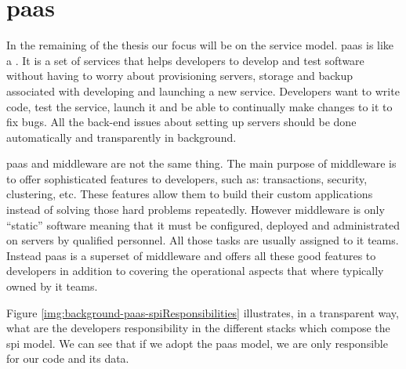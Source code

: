 %
%
\section{\acf{paas}}
\label{sec:background-paas}
In the remaining of the thesis our focus will be on the  service model.
\ac{paas} is like a . It is a set of services that helps developers
to develop and test software without having to worry about provisioning servers, storage and backup
associated with developing and launching a new service. Developers want to write code, test the service,
launch it and be able to continually make changes to it to fix bugs. All the back-end issues about setting
up servers should be done automatically and transparently in background.

\ac{paas} and middleware are not the same thing. The main purpose of middleware is to offer
sophisticated features to developers, such as: transactions, security, clustering, etc. These features
allow them to build their custom applications instead of solving those hard problems repeatedly.
However middleware is only ``static'' software meaning that it must be configured, deployed and
administrated on servers by qualified personnel. All those tasks are usually assigned to \acs{it} teams.
Instead \ac{paas} is a superset of middleware and offers all these good features to developers
in addition to covering the operational aspects that where typically owned by \acs{it} teams.

Figure \ref{img:background-paas-spiResponsibilities} illustrates, in a transparent way, what are the
developers responsibility in the different stacks which compose the \ac{spi} model. We can see that
if we adopt the \ac{paas} model, we are only responsible for our code and its data.

